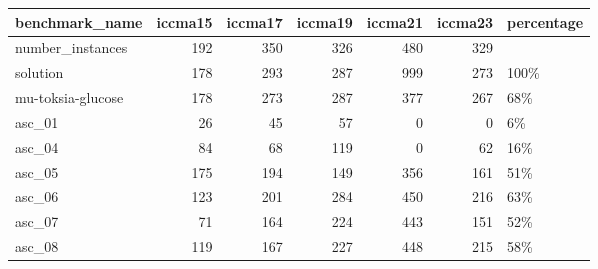 \begin{tabular}{lrrrrrl}
\toprule
benchmark\_name &  iccma15 &  iccma17 &  iccma19 &  iccma21 &  iccma23 & percentage \\
\midrule
number\_instances  &      192 &      350 &      326 &      480 &      329 &            \\
solution          &      178 &      293 &      287 &      999 &      273 &       100\% \\
mu-toksia-glucose &      178 &      273 &      287 &      377 &      267 &        68\% \\
asc\_01            &       26 &       45 &       57 &        0 &        0 &         6\% \\
asc\_04            &       84 &       68 &      119 &        0 &       62 &        16\% \\
asc\_05            &      175 &      194 &      149 &      356 &      161 &        51\% \\
asc\_06            &      123 &      201 &      284 &      450 &      216 &        63\% \\
asc\_07            &       71 &      164 &      224 &      443 &      151 &        52\% \\
asc\_08            &      119 &      167 &      227 &      448 &      215 &        58\% \\
\bottomrule
\end{tabular}
